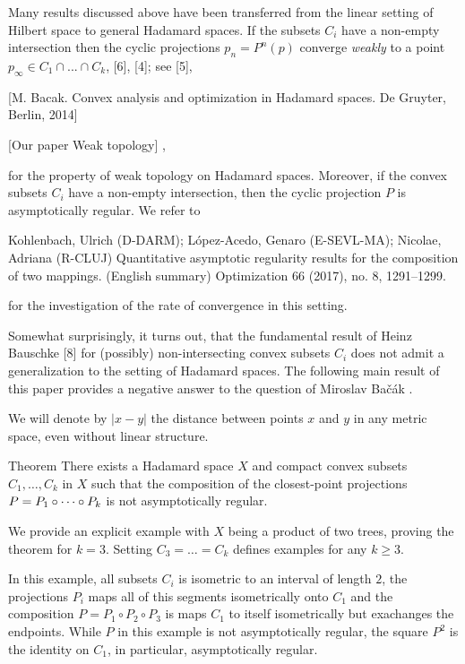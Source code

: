 \documentclass[a4paper,10pt]{article}
\begin{document}
Many results discussed above have been transferred from the linear setting of Hilbert space
to general Hadamard spaces.  If the subsets $C_i$ have a non-empty intersection then 
the cyclic projections $p_n=P^n (p)$ converge \emph{weakly} to a point $p_{\infty} \in C_1\cap ...\cap C_k$, [6], [4]; see [5], 

[M. Bacak. Convex analysis and optimization in Hadamard spaces. De
Gruyter, Berlin, 2014]

[Our paper {Weak topology}] ,  

for the property of weak topology on Hadamard spaces.   Moreover, if the convex subsets $C_i$ have a non-empty intersection, then the cyclic projection $P$ is asymptotically regular.  We refer to 


Kohlenbach, Ulrich (D-DARM); López-Acedo, Genaro (E-SEVL-MA); Nicolae, Adriana (R-CLUJ)
Quantitative asymptotic regularity results for the composition of two mappings. (English summary)
Optimization 66 (2017), no. 8, 1291–1299. 

for the investigation of the rate of convergence in this setting.

Somewhat surprisingly, it turns out, that the fundamental result of Heinz Bauschke [8] for (possibly) non-intersecting convex subsets $C_i$ does not admit  a generalization to the
 setting of Hadamard spaces.  The following main result of this paper provides a negative answer to  the question of Miroslav Bačák \cite[Problem 6.13]{Bac}.

We will denote by $|x-y|$ the distance between points $x$ and $y$ in any metric space, even without linear structure.

\begin{thm}{Theorem}\label{thm}
There exists a Hadamard space $X$ and compact convex subsets $C_1,\dots,C_k$ in $X$ such that the composition of the closest-point projections $P\z= P_1\circ \dots \circ P_k$ is not asymptotically regular.
\end{thm}


We provide an explicit example with $X$ being a product of two trees, proving the theorem  for  $k=3$.
Setting $C_3=\dots=C_k$ defines examples for any $k\geq 3$.  

In this example, all subsets $C_i$ is isometric to an interval of length $2$, the projections $P_i$ maps all of this segments isometrically onto $C_1$ and the composition $P=P_1\circ P_2\circ P_3$ is maps $C_1$ to itself isometrically but exachanges the endpoints.      While $P$ in this example is not asymptotically regular, the square $P^2$ is the identity on $C_1$, in particular, asymptotically regular. 
\end{document}
